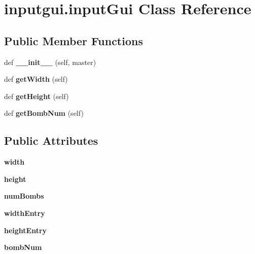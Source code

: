 \hypertarget{classinputgui_1_1input_gui}{}\section{inputgui.\+input\+Gui Class Reference}
\label{classinputgui_1_1input_gui}
\subsection*{Public Member Functions}
\begin{DoxyCompactItemize}
\item 
\mbox{\label{classinputgui_1_1input_gui_af9af6444741570b26c7f419d11c6e823}} 
def {\bfseries \+\_\+\+\_\+init\+\_\+\+\_\+} (self, master)
\item 
\mbox{\label{classinputgui_1_1input_gui_acb2f03dc243b615d56b85025e72fe83d}} 
def {\bfseries get\+Width} (self)
\item 
\mbox{\label{classinputgui_1_1input_gui_a0f58dcdd5da2004e96ce2e846aa8d70b}} 
def {\bfseries get\+Height} (self)
\item 
\mbox{\label{classinputgui_1_1input_gui_ad092a378c7af02c7bef4055297ad10d0}} 
def {\bfseries get\+Bomb\+Num} (self)
\end{DoxyCompactItemize}
\subsection*{Public Attributes}
\begin{DoxyCompactItemize}
\item 
\mbox{\label{classinputgui_1_1input_gui_a111f8e332432a90ad5afc1cf9c28c2e8}} 
{\bfseries width}
\item 
\mbox{\label{classinputgui_1_1input_gui_a63df299e701f8ca402988495b384368f}} 
{\bfseries height}
\item 
\mbox{\label{classinputgui_1_1input_gui_a62e0a13711c70a8850c47265683eb048}} 
{\bfseries num\+Bombs}
\item 
\mbox{\label{classinputgui_1_1input_gui_abeb3916d0c4ec6540cf540cd276f4269}} 
{\bfseries width\+Entry}
\item 
\mbox{\label{classinputgui_1_1input_gui_a191a2aeabc5247c3b214de35c0eabce0}} 
{\bfseries height\+Entry}
\item 
\mbox{\label{classinputgui_1_1input_gui_adcdf2fa640444a279c20d0e44a1c0d99}} 
{\bfseries bomb\+Num}
\end{DoxyCompactItemize}


